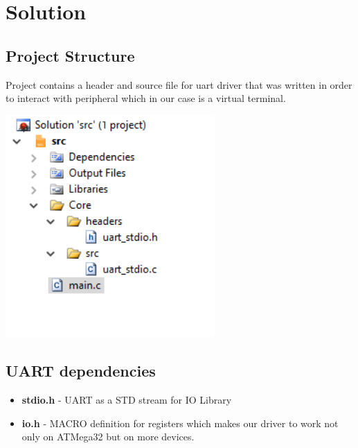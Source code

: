 \section{Solution}

\subsection{Project Structure}
Project contains a header and source file for uart driver that was written in order to interact with peripheral which in our case is a virtual terminal.\\
\centerline{
	\includegraphics[width=0.6\textwidth]{solution/images/src.png}
}


\subsection{UART dependencies}
\begin{itemize}
	\item \textbf{\large stdio.h} - UART as a STD stream for IO Library
	\item \textbf{\large io.h} - MACRO definition for registers which makes our driver to work not only on ATMega32 but on more devices.
\end{itemize}

